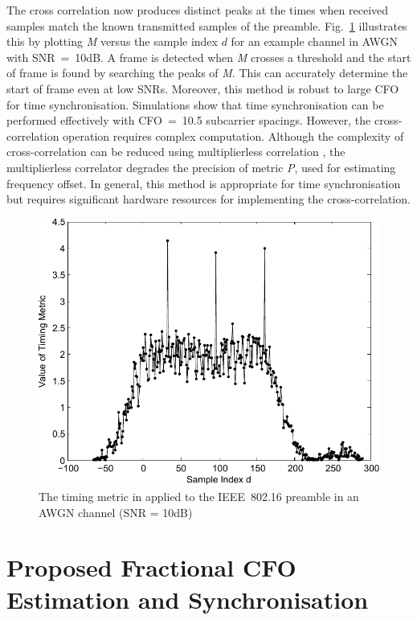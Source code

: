 The cross correlation now produces distinct peaks at the times when received samples match the known transmitted samples of the preamble. Fig.~\ref{fig:M2-10dB} illustrates this by plotting \emph{M} versus the sample index $d$ for an example channel in AWGN with SNR~=~10{\thinspace}dB.
A frame is detected when \emph{M} crosses a threshold and the start of frame is found by searching the peaks of \emph{M}.
This can accurately determine the start of frame even at low SNRs.
Moreover, this method is robust to large CFO for time synchronisation.
Simulations \cite{Kishore2006} show that time synchronisation can be performed effectively with CFO~=~10.5 subcarrier spacings.
However, the cross-correlation operation requires complex computation.
Although the complexity of cross-correlation can be reduced using multiplierless correlation \cite{Yip2003}, the multiplierless correlator degrades the precision of metric \emph{P}, used for estimating frequency offset.
In general, this method is appropriate for time synchronisation but requires significant hardware resources for implementing the cross-correlation.

\begin{figure}
	\centerline{\includegraphics [width=0.8\columnwidth] {figures/M2_10dB.pdf} }
	\caption{The timing metric in \cite{Kishore2006} applied to the IEEE~802.16 preamble in an AWGN channel (SNR = 10dB)}
	\label{fig:M2-10dB}
\end{figure}

\section{Proposed Fractional CFO Estimation and Synchronisation}

